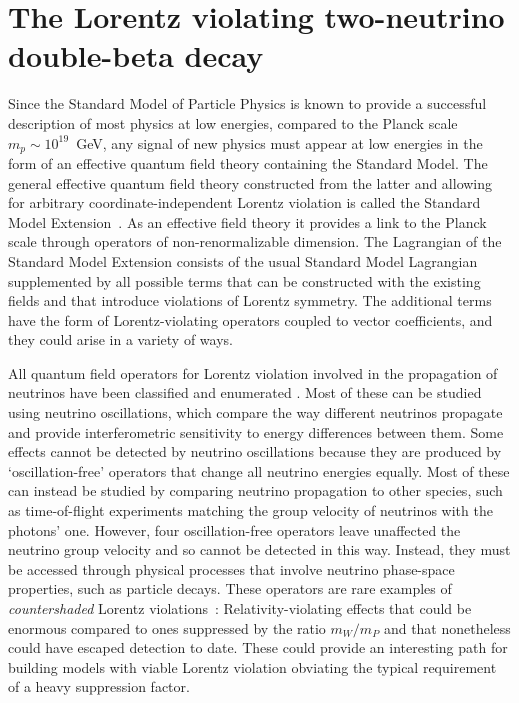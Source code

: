 \section{The Lorentz violating two-neutrino double-beta decay}

Since the Standard Model of Particle Physics is known to provide a successful
description of most physics at low energies, compared to the Planck scale
$m_p\sim10^{19}$~GeV, any signal of new physics must appear at low energies in
the form of an effective quantum field theory containing the Standard Model.
The general effective quantum field theory constructed from the latter and
allowing for arbitrary coordinate-independent Lorentz violation is called the
Standard Model Extension~\cite{SME1997,SME1998}. As an effective field theory
it provides a link to the Planck scale through operators of non-renormalizable
dimension. The Lagrangian of the Standard Model Extension consists of the usual
Standard Model Lagrangian supplemented by all possible terms that can be
constructed with the existing fields and that introduce violations of Lorentz
symmetry. The additional terms have the form of Lorentz-violating operators
coupled to vector coefficients, and they could arise in a variety of ways.

All quantum field operators for Lorentz violation involved in the propagation
of neutrinos have been classified and enumerated \cite{SMEneutrinos}. Most of
these can be studied using neutrino oscillations, which compare the way
different neutrinos propagate and provide interferometric sensitivity to energy
differences between them. Some effects cannot be detected by neutrino
oscillations because they are produced by ‘oscillation-free’ operators that
change all neutrino energies equally. Most of these can instead be studied by
comparing neutrino propagation to other species, such as time-of-flight
experiments matching the group velocity of neutrinos with the photons' one.
However, four oscillation-free operators leave unaffected the neutrino group
velocity and so cannot be detected in this way. Instead, they must be accessed
through physical processes that involve neutrino phase-space properties, such
as particle decays. These operators are rare examples of \textit{countershaded}
Lorentz violations~\cite{SMEcountersh}: Relativity-violating effects that could
be enormous compared to ones suppressed by the ratio $m_W/m_P$ and that
nonetheless could have escaped detection to date. These could provide an
interesting path for building models with viable Lorentz violation obviating
the typical requirement of a heavy suppression factor.

